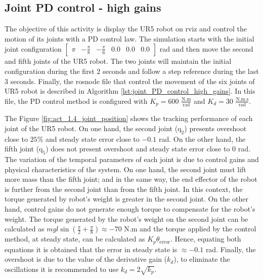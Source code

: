 \subsection{Joint PD control - high gains}
The objective of this activity is display the UR5 robot on rviz and control the motion of its joints with a PD control law. The simulation starts with the initial joint configuration $\begin{bmatrix} \pi & -\frac{\pi}{8} & -\frac{\pi}{6} & 0.0 & 0.0 & 0.0 \end{bmatrix}$ rad and then move the second and fifth joints of the UR5 robot. The two joints will maintain the initial configuration during the first $2$ seconds and follow a step reference during the last $3$ seconds. Finally, the rosnode file that control the movement of the six joints of UR5 robot is described in Algorithm \ref{lst:joint_PD_control_high_gains}. In this file, the PD control method is configured with $K_p=600$ $\mathrm{\frac{N.m}{rad}}$ and $K_d=30$ $\mathrm{\frac{N.m.s}{rad}}$. 

The Figure \ref{fig:act_1.4_joint_position} shows the tracking performance of each joint of the UR5 robot. On one hand, the second joint ($\mathrm{q}_2$) presents overshoot close to $25\%$ and steady state error close to $-0.1$ rad. On the other hand, the fifth joint ($\mathrm{q}_5$) does not present overshoot and steady state error close to $0$ rad. The variation of the temporal parameters of each joint is due to control gains and physical characteristics of the system. On one hand, the second joint must lift more mass than the fifth joint; and in the same way, the end effector of the robot is further from the second joint than from the fifth joint. In this context, the torque generated by robot's weight is greater in the second joint. On the other hand, control gains do not generate enough torque to compensate for the robot's weight. The torque generated by the robot's weight on the second joint can be calculated as $m g l \sin({\frac{\pi}{2} + \frac{\pi}{8}}) \approx -70$ N.m and the torque applied by the control method, at steady state, can be calculated as $K_p \theta_{\mathrm{error}}$. Hence, equating both equations it is obtained that the error in steady state is $\approx -0.1$ rad. Finally, the overshoot is due to the value of the derivative gain ($k_d$), to eliminate the oscillations it is recommended to use $k_d = 2 \sqrt{k_p}$. \vspace{5px}

